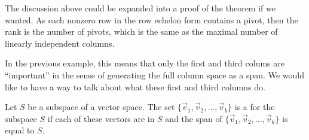 \documentclass{ximera}
\begin{document}
 
The discussion above could be expanded into a proof of the theorem if we wanted. As each nonzero row in the row echelon form contains a pivot, then the rank is the number of pivots, which is the same as the maximal number of linearly independent columns. 

In the previous example, this means that only the first and third colums are ``important'' in the sense of generating the full column space as a span. We would like to have a way to talk about what these first and third columns do.

\begin{definition}
    Let $S$ be a subspace of a vector space. The set $\{\vec{v}_1, \vec{v}_2, ..., \vec{v}_k\}$ is a \emph{} for the subspace $S$ if each of these vectors are in $S$ and the span of $\{\vec{v}_1, \vec{v}_2, ..., \vec{v}_k\}$ is equal to $S$. 
\end{definition}
\end{document}

